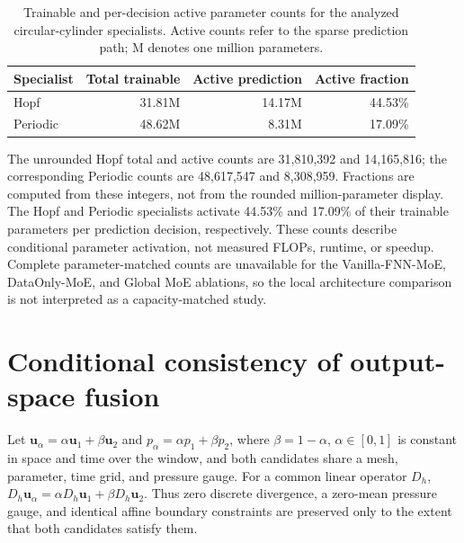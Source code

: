 \documentclass{article}
\begin{document}
\par
\begin{table}[H]
\centering
\caption{Trainable and per-decision active parameter counts for the analyzed
circular-cylinder specialists. Active counts refer to the sparse prediction
path; M denotes one million parameters.}
\label{tab:parameter_counts}
\begin{tabular}{lrrr}
\toprule
Specialist & Total trainable & Active prediction & Active fraction \\
\midrule
Hopf & 31.81M & 14.17M & 44.53\% \\
Periodic & 48.62M & 8.31M & 17.09\% \\
\bottomrule
\end{tabular}
\end{table}
\par

The unrounded Hopf total and active counts are 31,810,392 and 14,165,816; the corresponding Periodic counts are 48,617,547 and 8,308,959. Fractions are computed from these integers, not from the rounded million-parameter display.
The Hopf and Periodic specialists activate 44.53\% and 17.09\% of their
trainable parameters per prediction decision, respectively. These counts
describe conditional parameter activation, not measured FLOPs, runtime,
or speedup. Complete parameter-matched counts are unavailable for the
Vanilla-FNN-MoE, DataOnly-MoE, and Global MoE ablations, so the local
architecture comparison is not interpreted as a capacity-matched study.

\clearpage
\section{Conditional consistency of output-space fusion}
\label{app:fusion_consistency}
Let $\bm u_\alpha=\alpha\bm u_1+\beta\bm u_2$ and $p_\alpha=\alpha p_1+\beta p_2$, where $\beta=1-\alpha$, $\alpha\in[0,1]$ is constant in space and time over the window, and both candidates share a mesh, parameter, time grid, and pressure gauge. For a common linear operator $D_h$, $D_h\bm u_\alpha=\alpha D_h\bm u_1+\beta D_h\bm u_2$. Thus zero discrete divergence, a zero-mean pressure gauge, and identical affine boundary constraints are preserved only to the extent that both candidates satisfy them.
\end{document}
